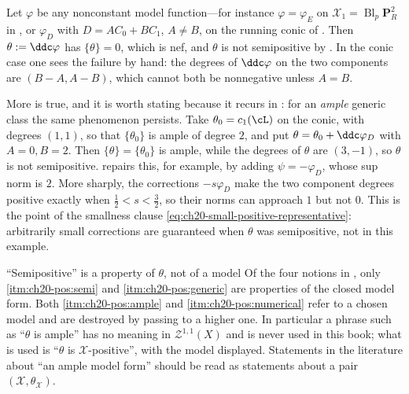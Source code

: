 \begin{example}
\label{ex:ch20-nef-generic-not-semipositive}
Let $\varphi$ be any nonconstant model function---for instance
$\varphi=\varphi_E$ on $\mathcal X_1=\operatorname{Bl}_p\mathbf P^2_R$
in , or
$\varphi_D$ with $D=AC_0+BC_1$, $A\neq B$, on the running conic of
.  Then $\theta:=\ddc\varphi$ has
$\{\theta\}=0$, which is nef, and $\theta$ is not semipositive by
.  In the conic case one sees the
failure by hand: the degrees of $\ddc\varphi$ on the two components are
$(B-A,A-B)$, which cannot both be nonnegative unless $A=B$.

More is true, and it is worth stating because it recurs in
: for an \emph{ample} generic class the same
phenomenon persists.  Take $\theta_0=c_1(\cL)$ on the conic, with degrees
$(1,1)$, so that $\{\theta_0\}$ is ample of degree $2$, and put
$\theta=\theta_0+\ddc\varphi_D$ with $A=0,B=2$.  Then
$\{\theta\}=\{\theta_0\}$ is ample, while the degrees of $\theta$ are
$(3,-1)$, so $\theta$ is not semipositive.
 repairs this, for example, by
adding $\psi=-\varphi_D$, whose sup norm is $2$.  More sharply, the
corrections $-s\varphi_D$ make the two component degrees positive exactly
when $\tfrac12<s<\tfrac32$, so their norms can approach $1$ but not $0$.
This is the point of the smallness clause
\eqref{eq:ch20-small-positive-representative}: arbitrarily small corrections
are guaranteed when $\theta$ was semipositive, not in this example.
\end{example}

\begin{warning}{``Semipositive'' is a property of $\theta$, not of a model}
Of the four notions in , only
\cref{itm:ch20-pos:semi} and \cref{itm:ch20-pos:generic} are properties of the
closed model form.  Both \cref{itm:ch20-pos:ample} and
\cref{itm:ch20-pos:numerical} refer to a chosen model and are destroyed by
passing to a higher one.  In particular a phrase such as ``$\theta$ is
ample'' has no meaning in $\mathcal Z^{1,1}(X)$ and is never used in this
book; what is used is ``$\theta$ is $\mathcal X$-positive'', with the
model displayed.  Statements in the literature about ``an ample model
form'' should be read as statements about a pair $(\mathcal X,\theta_{\mathcal X})$.
\end{warning}

